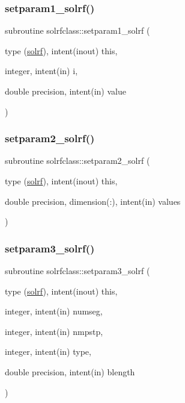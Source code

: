 \subsubsection{\texorpdfstring{setparam1\_solrf()}{setparam1\_solrf()}}
{\footnotesize\ttfamily subroutine solrfclass\+::setparam1\+\_\+solrf (\begin{DoxyParamCaption}\item[{type (\mbox{\hyperlink{namespacesolrfclass_structsolrfclass_1_1solrf}{solrf}}), intent(inout)}]{this,  }\item[{integer, intent(in)}]{i,  }\item[{double precision, intent(in)}]{value }\end{DoxyParamCaption})}

\mbox{\label{namespacesolrfclass_a4f5cee7483285ca745064b5331f3c30f}} 
\subsubsection{\texorpdfstring{setparam2\_solrf()}{setparam2\_solrf()}}
{\footnotesize\ttfamily subroutine solrfclass\+::setparam2\+\_\+solrf (\begin{DoxyParamCaption}\item[{type (\mbox{\hyperlink{namespacesolrfclass_structsolrfclass_1_1solrf}{solrf}}), intent(inout)}]{this,  }\item[{double precision, dimension(\+:), intent(in)}]{values }\end{DoxyParamCaption})}

\mbox{\label{namespacesolrfclass_ae51249f1d976b6ff71436430614a854e}} 
\subsubsection{\texorpdfstring{setparam3\_solrf()}{setparam3\_solrf()}}
{\footnotesize\ttfamily subroutine solrfclass\+::setparam3\+\_\+solrf (\begin{DoxyParamCaption}\item[{type (\mbox{\hyperlink{namespacesolrfclass_structsolrfclass_1_1solrf}{solrf}}), intent(inout)}]{this,  }\item[{integer, intent(in)}]{numseg,  }\item[{integer, intent(in)}]{nmpstp,  }\item[{integer, intent(in)}]{type,  }\item[{double precision, intent(in)}]{blength }\end{DoxyParamCaption})}



